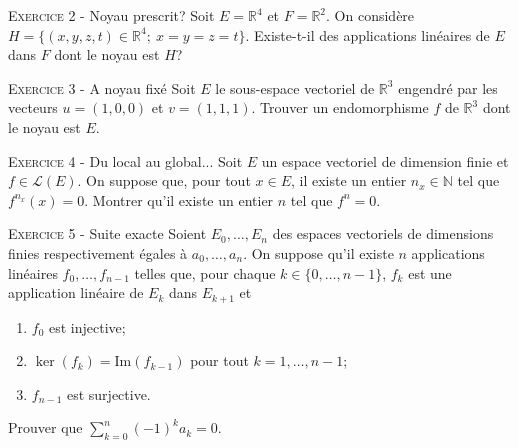 \vskip0.3cm\noindent\textsc{Exercice 2} - Noyau prescrit?
\vskip0.2cm
Soit $E=\mathbb R^4$ et $F=\mathbb R^2$. On considère
$H=\{(x,y,z,t)\in\mathbb R^4;\ x=y=z=t\}$. Existe-t-il des applications linéaires de $E$ dans $F$
dont le noyau est $H$?




\vskip0.3cm\noindent\textsc{Exercice 3} - A noyau fixé
\vskip0.2cm
Soit $E$ le sous-espace vectoriel de $\mathbb R^3$ engendré par les vecteurs
$u=(1,0,0)$ et $v=(1,1,1)$. Trouver un endomorphisme $f$ de $\mathbb R^3$ dont le noyau est $E$.




\vskip0.3cm\noindent\textsc{Exercice 4} - Du local au global...
\vskip0.2cm
Soit $E$ un espace vectoriel de dimension finie et $f\in\mathcal L(E)$.
On suppose que, pour tout $x\in E$, il existe un entier $n_x\in\mathbb N$ tel
que $f^{n_x}(x)=0.$ Montrer qu'il existe un entier $n$ tel que $f^n=0$.




\vskip0.3cm\noindent\textsc{Exercice 5} - Suite exacte
\vskip0.2cm
Soient $E_0,\dots,E_n$ des espaces vectoriels de dimensions finies respectivement égales à $a_0,\dots,a_n$. 
On suppose qu'il existe $n$ applications linéaires $f_0,\dots,f_{n-1}$ telles que, pour chaque $k\in\{0,\dots,n-1\}$,
$f_k$ est une application linéaire de $E_k$ dans $E_{k+1}$ et 
\begin{enumerate}
\item $f_0$ est injective;
\item $\ker(f_k)=\textrm{Im}(f_{k-1})$ pour tout $k=1,\dots,n-1$;
\item $f_{n-1}$ est surjective.
\end{enumerate}
Prouver que $\sum_{k=0}^n (-1)^k a_k=0$.




\vskip0.5cm

